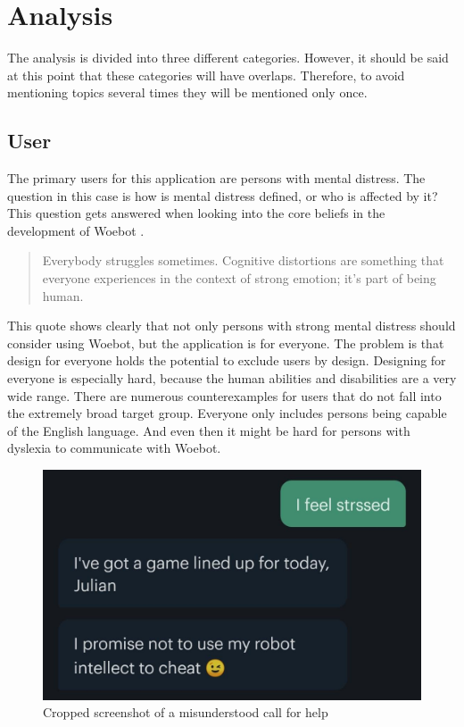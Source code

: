 \section{Analysis}\label{sec:analysis}
The analysis is divided into three different categories.
However, it should be said at this point that these categories will have overlaps.
Therefore, to avoid mentioning topics several times they will be mentioned only once.

\subsection{User}
The primary users for this application are persons with mental distress.
The question in this case is how is mental distress defined, or who is affected by it?
This question gets answered when looking into the core beliefs in the development of Woebot \cite{woebot-beliefs}.

\begin{quote}
    Everybody struggles sometimes. Cognitive distortions are something that everyone experiences in the context of strong emotion; it's part of being human.
\end{quote}

This quote shows clearly that not only persons with strong mental distress should consider using Woebot, but the application is for everyone.
The problem is that design for everyone holds the potential to exclude users by design\cite{feminist-technology}.
Designing for everyone is especially hard, because the human abilities and disabilities are a very wide range.
There are numerous counterexamples for users that do not fall into the extremely broad target group.
Everyone only includes persons being capable of the English language.
And even then it might be hard for persons with dyslexia to communicate with Woebot.\\

\begin{figure}[ht]
    \begin{center}
        \includegraphics[width=1\columnwidth]{files/dyslexia.png}
        \caption{\label{fig:dyslexia} Cropped screenshot of a misunderstood call for help}
    \end{center}
\end{figure}

